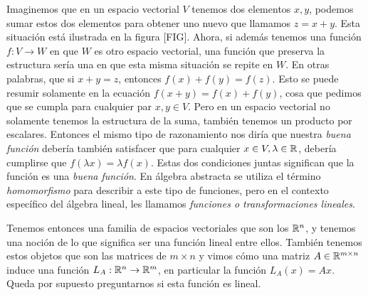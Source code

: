 Imaginemos que en un espacio vectorial $V$ tenemos dos elementos $x, y$, podemos sumar estos dos elementos para obtener uno nuevo que llamamos $z = x + y$. Esta situación está ilustrada en la figura [FIG]. Ahora, si además tenemos una función $f: V \to W$ en que $W$ es otro espacio vectorial, una función que preserva la estructura sería una en que esta misma situación se repite en $W$. En otras palabras, que si $x + y = z$, entonces $f(x) + f(y) = f(z)$. Esto se puede resumir solamente en la ecuación $f(x + y) = f(x) + f(y)$, cosa que pedimos que se cumpla para cualquier par $x, y \in V$. Pero en un espacio vectorial no solamente tenemos la estructura de la suma, también tenemos un producto por escalares. Entonces el mismo tipo de razonamiento nos diría que nuestra \textit{buena función} debería también satisfacer que para cualquier $x \in V, \lambda \in \mathbb{R}$, debería cumplirse que $f(\lambda x) = \lambda f(x)$. Estas dos condiciones juntas significan que la función es una \textit{buena función}. En álgebra abstracta se utiliza el término \textit{homomorfismo} para describir a este tipo de funciones, pero en el contexto específico del álgebra lineal, les llamamos \textit{funciones o transformaciones lineales}.

Tenemos entonces una familia de espacios vectoriales que son los $\mathbb{R}^n$, y tenemos una noción de lo que significa ser una función lineal entre ellos. También tenemos estos objetos que son las matrices de $m \times n$ y vimos cómo una matriz $A \in \mathbb{R}^{m \times n}$ induce una función $L_A: \mathbb{R}^n \to \mathbb{R}^m$, en particular la función $L_A (x) = Ax$. Queda por supuesto preguntarnos si esta función es lineal.